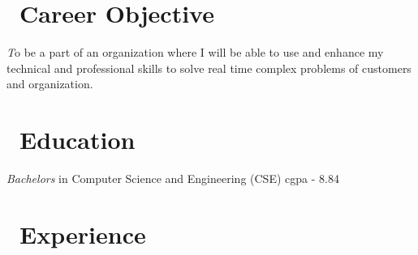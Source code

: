 \documentclass{resume}
\begin{document}
 
 
 
\section{\faGraduationCap\ Career Objective}
\textit To be a part of an organization where I will be able to use and enhance my technical and professional skills to solve real time complex problems of customers and organization. 

 
 
\section{\faGraduationCap\ Education}
\textit{Bachelors} in Computer Science and Engineering (CSE) \hfill cgpa - 8.84

 
\section{\faUsers\ Experience}
 
 
\end{document}

